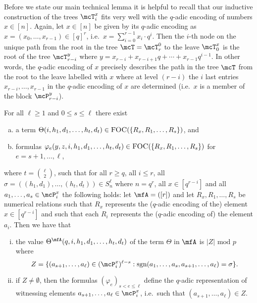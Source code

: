 \documentclass[a4paper,UKenglish]{lipics}
\newcommand{\inseg}[1]{\ensuremath{[#1]}}
\newcommand{\card}[1]{\ensuremath{|#1|}}
\newcommand{\sgn}{\ensuremath{\textrm{sgn}}}
\newcommand{\modulo}{\ensuremath{\text{mod }}}
\newcommand{\logic}[1]{\ensuremath{\textsc{#1}}\xspace}
\newcommand{\FOC}{\logic{FOC}}
\renewcommand{\phi}{\varphi}
\theoremstyle{plain}
\begin{document}
Before we state our main technical lemma it is helpful to recall that our 
inductive construction of the trees $\mcT_i^x$ fits very well with the 
$q$-adic encoding 
of numbers $x \in \inseg n$.
Again, let $x \in \inseg{n}$ be given by its $q$-adic encoding as 
$x = (x_0, \dots, x_{r-1}) \in \inseg{q}^r$, i.e.\ $ x = \sum_{i = 
0}^{r-1} x_i \cdot q^i$. Then the $i$-th node on the unique path from the root 
in the tree $\mcT = \mcT_r^0$  to the leave $\mcT_0^x$ is the root of the tree 
$\mcT_{r-i}^{y}$ where $y = x_{r-i} + x_{r-i+1} q + \cdots + x_{r-1} q^{i-1}$. 
In other words, the $q$-adic encoding of $x$ precisely describes the 
path in the tree $\mcT$ from the root to the leave labelled with $x$ where 
at level $(r-i)$ the $i$ last entries $x_{r-i}, \dots, x_{r-1}$  in 
the $q$-adic encoding of $x$ are determined (i.e.\ $x$ is a member of the 
block $\mcP_{r-i}^y$).


\begin{lemma}\label{lemma:counting:realisations:sgn}
  For all $\ell \geq 1$ and $0 \leq s \leq \ell$ there exist
 \begin{enumerate}[(a)]
  \item a term $\Theta(i,h_1,d_1, \dots, h_t, d_t) \in \FOC(\{ 
R_x, R_1, \dots, R_s \})$, and
  \item formulas $\phi_e(y,z,i,h_1,d_1, \dots, h_t,d_t) \in 
\FOC(\{ R_x, R_1, \dots, R_s \}) $ for $e = s+1, \dots, \ell$,
 \end{enumerate}
where $t = {\ell \choose 2}$, such that for all $r \geq q$, all $i \leq 
r$, all 
$\sigma=((h_1, d_1), \dots, (h_t, d_t)) \in S_n^\ell$ 
where $n = q^r$, all $x \in \inseg{q^{r-i}}$ and all $a_1, \dots, a_s 
\in \mcP_i^x$ the following holds: let $\mfA = (\inseg{r})$ and let $R_x, 
R_1, \dots, R_s$ be numerical relations such that $R_x$ represents the 
($q$-adic 
encoding of the) element $x \in \inseg{q^{r-i}}$ and such that each $R_i$ 
represents 
the  ($q$-adic encoding of) the element $a_i$. Then we have that
 \begin{enumerate}[(i)]
  \item the value $\Theta^\mfA(q,i,h_1,d_1, \dots, h_t, d_t)$ of the 
term $\Theta$ in $\mfA$ is $\card{Z} \,\,\modulo p$ where 
\[Z = \{ (a_{s+1}, \dots, a_\ell) \in (\mcP_i^x)^{ \ell -s } : \sgn(a_1, 
\dots, a_s, a_{s+1}, \dots, a_\ell) = 
\sigma \}. \]
 \item if $Z \neq \emptyset$, then the formulas $(\phi_e)_{s < e \leq 
\ell}$ define the $q$-adic representation of witnessing elements $a_{s+1}, 
\dots, a_\ell \in \mcP_i^x$, i.e.\ such that $(a_{s+1}, \dots, a_\ell) \in 
Z$.
\end{enumerate}

\end{lemma}
\end{document}
